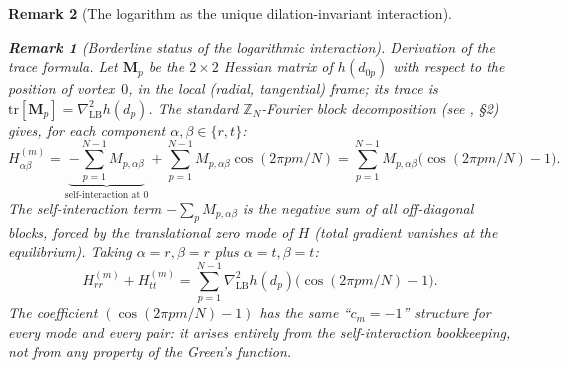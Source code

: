 \documentclass[12pt, a4paper]{article}
\newtheorem{remark}{Remark}[section]
\numberwithin{equation}{section}
\begin{document}
\begin{remark}[The logarithm as the unique dilation-invariant interaction]
\begin{remark}[Borderline status of the logarithmic interaction]
\smallskip
\noindent\emph{Derivation of the trace formula.}
Let $\mathbf{M}_p$ be the $2{\times}2$ Hessian matrix of $h(d_{0p})$
with respect to the position of vortex~$0$, in the local
(radial, tangential) frame; its trace is
$\mathrm{tr}[\mathbf{M}_p] = \nabla^2_{\mathrm{LB}} h(d_p)$.
The standard $\mathbb{Z}_N$-Fourier block decomposition (see
\citealt{Havelock1931}, \S2) gives, for each component
$\alpha,\beta\in\{r,t\}$:
\[
  H_{\alpha\beta}^{(m)}
  = \underbrace{-\sum_{p=1}^{N-1} M_{p,\alpha\beta}}_{\text{self-interaction at }0}
  + \sum_{p=1}^{N-1} M_{p,\alpha\beta}\cos(2\pi pm/N)
  = \sum_{p=1}^{N-1} M_{p,\alpha\beta}\bigl(\cos(2\pi pm/N)-1\bigr).
\]
The self-interaction term $-\sum_p M_{p,\alpha\beta}$ is the negative
sum of all off-diagonal blocks, forced by the translational zero mode
of $H$ (total gradient vanishes at the equilibrium).
Taking $\alpha = r, \beta = r$ plus $\alpha = t, \beta = t$:
\begin{equation}\label{eq:trace-formula}
  H_{rr}^{(m)} + H_{tt}^{(m)}
  = \sum_{p=1}^{N-1} \nabla^2_{\mathrm{LB}} h(d_p)
    \bigl(\cos(2\pi pm/N) - 1\bigr).
\end{equation}
The coefficient $(\cos(2\pi pm/N)-1)$ has the same ``$c_m = -1$''
structure for every mode and every pair: it arises entirely from
the self-interaction bookkeeping, not from any property of the
Green's function.


\end{remark}
\end{remark}
\end{document}
